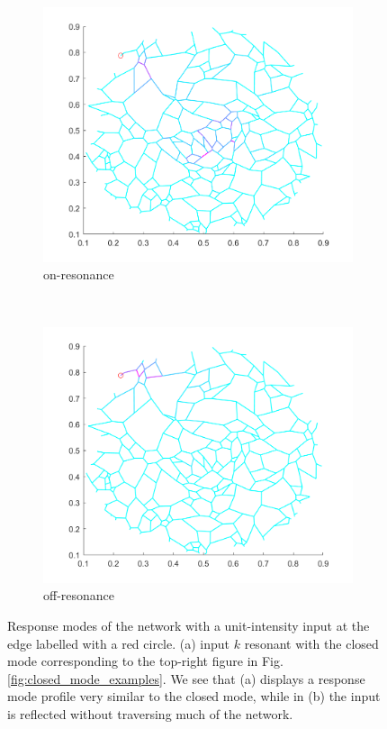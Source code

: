 \begin{figure}[h]
    \centering
    \begin{subfigure}[b]{0.23\textwidth}
        \includegraphics[width=\textwidth]{ch2/fig2/resonant_response_example.png}
        \caption{on-resonance}
    \end{subfigure}
~\quad\quad
    \begin{subfigure}[b]{0.23\textwidth}
        \includegraphics[width=\textwidth]{ch2/fig2/offresonant_response_example.png}
        \caption{off-resonance}
    \end{subfigure}
    
    \caption{Response modes of the network with a unit-intensity input at the edge labelled with a red circle. (a) input $k$ resonant with the closed mode corresponding to the top-right figure in Fig.\ref{fig:closed_mode_examples}. We see that (a) displays a response mode profile very similar to the closed mode, while in (b) the input is reflected without traversing much of the network.}\label{fig:on_off_resonence_response}
\end{figure}

